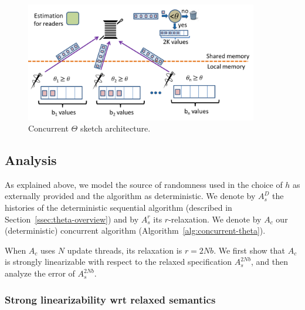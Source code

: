 \begin{figure}[H]
    \centering
    \includegraphics[width=4in]{images/thetaConcurrent.png}
    \caption{Concurrent $\Theta$ sketch architecture.
    }
    \label{fig:concurrentTheta}
\end{figure}

\subsection{Analysis}
\label{ssec:theta-analysis}

As explained above, we model the source of randomness used in the choice of $h$ as externally provided and the algorithm as  deterministic. We denote by $A^D_s$ the histories  of the deterministic sequential algorithm  (described in Section~\ref{ssec:theta-overview}) and by $A^r_s$ its $r$-relaxation. We denote by $A_c$ 
our (deterministic) concurrent algorithm (Algorithm~\ref{alg:concurrent-theta}).

When  $A_c$  uses $N$ update threads, its relaxation is $r=2Nb$. 
We first show that $A_c$  is strongly linearizable with respect to the relaxed specification $A^{2Nb}_s$,  and then analyze the error  of  $A^{2Nb}_s$.

\subsubsection{Strong linearizability wrt relaxed semantics}

